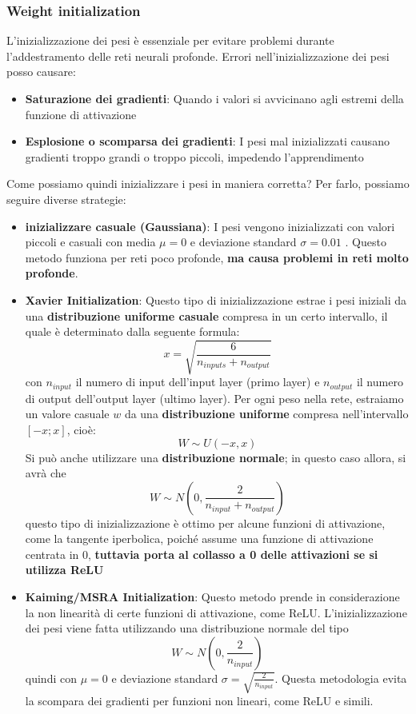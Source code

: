 \documentclass[12pt]{article}
\begin{document}
\subsubsection{Weight initialization}
L'inizializzazione dei pesi è essenziale per evitare problemi durante l'addestramento delle reti neurali profonde.
Errori nell'inizializzazione dei pesi posso causare:
\begin{itemize}
    \item \textbf{Saturazione dei gradienti}: Quando i valori si avvicinano agli estremi della funzione di attivazione
    \item \textbf{Esplosione o scomparsa dei gradienti}: I pesi mal inizializzati causano gradienti troppo grandi o troppo piccoli, impedendo l'apprendimento
\end{itemize}
Come possiamo quindi inizializzare i pesi in maniera corretta?
Per farlo, possiamo seguire diverse strategie:
\begin{itemize}
    \item \textbf{inizializzare casuale (Gaussiana)}: I pesi vengono inizializzati con valori piccoli e casuali con media $\mu = 0$ e deviazione standard $\sigma = 0.01$ .
    Questo metodo funziona per reti poco profonde, \textbf{ma causa problemi in reti molto profonde}.
    \item \textbf{Xavier Initialization}: Questo tipo di inizializzazione estrae i pesi iniziali da una \textbf{distribuzione uniforme casuale} compresa in un certo intervallo, il quale è determinato dalla seguente formula:
    $$x = \sqrt{\frac{6}{n_{inputs} + n_{output}}}$$
    con $n_{input}$ il numero di input dell'input layer (primo layer) e $n_{output}$ il numero di output dell'output layer (ultimo layer). Per ogni peso nella rete, estraiamo un valore casuale $w$ da una \textbf{distribuzione uniforme} compresa
    nell'intervallo $[-x; x]$, cioè:
    $$W \sim U(-x, x)$$
    Si può anche utilizzare una \textbf{distribuzione normale}; in questo caso allora, si avrà che
    $$W \sim N \left (0, \frac{2}{n_{input} + n_{output}} \right )$$
    questo tipo di inizializzazione è ottimo per alcune funzioni di attivazione, come la tangente iperbolica, poiché assume una funzione di attivazione centrata in 0, \textbf{tuttavia porta al collasso a 0 delle attivazioni se si utilizza ReLU}
    \item \textbf{Kaiming/MSRA Initialization}: Questo metodo prende in considerazione la non linearità di certe funzioni di attivazione, come ReLU.
    L'inizializzazione dei pesi viene fatta utilizzando una distribuzione normale del tipo
    $$W \sim N(0, \frac{2}{n_{input}})$$
    quindi con $\mu = 0$ e deviazione standard $\sigma = \sqrt{\frac{2}{n_{input}}}$.
    Questa metodologia evita la scompara dei gradienti per funzioni non lineari, come ReLU e simili.
\end{itemize}
\end{document}
